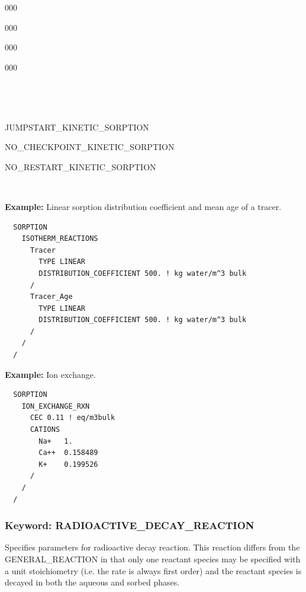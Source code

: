 \begin{deflist}{000}
\begin{deflist}{000}
\begin{deflist}{000}
\begin{deflist}{000}
\end{deflist}

\item [\keyend] ~
\end{deflist}

~\\

\item[JUMPSTART\_KINETIC\_SORPTION]
\item[NO\_CHECKPOINT\_KINETIC\_SORPTION]
\item[NO\_RESTART\_KINETIC\_SORPTION]
\end{deflist}

\item [\keyend]

~\\

\begin{mdframed}
{\bf Example:} Linear sorption distribution coefficient and mean age of a tracer.
\footnotesize
\begin{verbatim}
  SORPTION
    ISOTHERM_REACTIONS
      Tracer
        TYPE LINEAR 
        DISTRIBUTION_COEFFICIENT 500. ! kg water/m^3 bulk
      /
      Tracer_Age
        TYPE LINEAR 
        DISTRIBUTION_COEFFICIENT 500. ! kg water/m^3 bulk
      /
    /
  /
\end{verbatim}
\normalsize
\end{mdframed}

\begin{mdframed}
{\bf Example:} Ion exchange.
\footnotesize
\begin{verbatim}
  SORPTION
    ION_EXCHANGE_RXN
      CEC 0.11 ! eq/m3bulk
      CATIONS
        Na+   1.
        Ca++  0.158489
        K+    0.199526
      /
    /
  /
\end{verbatim}
\normalsize
\end{mdframed}

\clearpage
\protect\hypertarget{target_chem_rad}{}
\subsubsection{Keyword: RADIOACTIVE\_DECAY\_REACTION}

Specifies parameters for radioactive decay reaction. This reaction differs from the GENERAL\_REACTION in that only one reactant species may be specified with a unit stoichiometry (i.e. the rate is always first order) and the reactant species is decayed in both the aqueous and sorbed phases.

\hfill\hyperlink{target_key}{\return}


\end{deflist}
